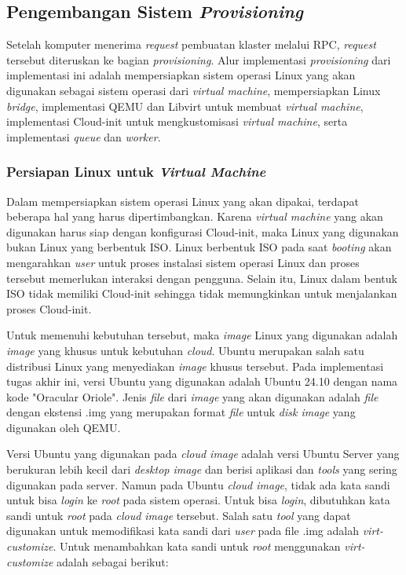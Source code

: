 

\subsection{Pengembangan Sistem \emph{Provisioning}}
\label{sec:provisioning}

Setelah komputer menerima \emph{request} pembuatan klaster melalui RPC,
\emph{request} tersebut diteruskan ke bagian \emph{provisioning}. Alur 
implementasi \emph{provisioning} dari implementasi ini adalah mempersiapkan
sistem operasi Linux yang akan digunakan sebagai sistem operasi dari
\emph{virtual machine}, mempersiapkan Linux \emph{bridge},
implementasi QEMU dan Libvirt untuk membuat \emph{virtual machine},
implementasi Cloud-init untuk mengkustomisasi \emph{virtual machine}, 
serta implementasi \emph{queue} dan \emph{worker}.

\subsubsection{Persiapan Linux untuk \emph{Virtual Machine}}
\label{sec:persiapan-linux-untuk-virtual-machine}

Dalam mempersiapkan sistem operasi Linux yang akan dipakai, terdapat beberapa
hal yang harus dipertimbangkan. Karena \emph{virtual machine} yang akan digunakan
harus siap dengan konfigurasi Cloud-init, maka Linux yang digunakan bukan Linux
yang berbentuk ISO. Linux berbentuk ISO pada saat \emph{booting} akan mengarahkan
\emph{user} untuk proses instalasi sistem operasi Linux dan proses tersebut memerlukan
interaksi dengan pengguna. Selain itu, Linux dalam bentuk ISO tidak memiliki Cloud-init
sehingga tidak memungkinkan untuk menjalankan proses Cloud-init.

Untuk memenuhi kebutuhan tersebut, maka \emph{image} Linux yang digunakan
adalah \emph{image} yang khusus untuk kebutuhan \emph{cloud}. Ubuntu merupakan
salah satu distribusi Linux yang menyediakan \emph{image} khusus tersebut.
Pada implementasi tugas akhir ini, versi Ubuntu yang digunakan adalah Ubuntu 24.10
dengan nama kode "Oracular Oriole". Jenis \emph{file} dari \emph{image} yang akan digunakan
adalah \emph{file} dengan ekstensi .img yang merupakan format \emph{file} untuk \emph{disk image}
yang digunakan oleh QEMU.

Versi Ubuntu yang digunakan pada \emph{cloud image} adalah versi Ubuntu Server yang
berukuran lebih kecil dari \emph{desktop image} dan berisi aplikasi dan \emph{tools}
yang sering digunakan pada server. Namun pada Ubuntu \emph{cloud image}, tidak ada
kata sandi untuk bisa \emph{login} ke \emph{root} pada sistem operasi. Untuk bisa \emph{login},
dibutuhkan kata sandi untuk \emph{root} pada \emph{cloud image} tersebut. Salah satu \emph{tool} yang
dapat digunakan untuk memodifikasi kata sandi dari \emph{user} pada file .img adalah \emph{virt-customize}.
Untuk menambahkan kata sandi untuk \emph{root} menggunakan \emph{virt-customize} adalah
sebagai berikut:

